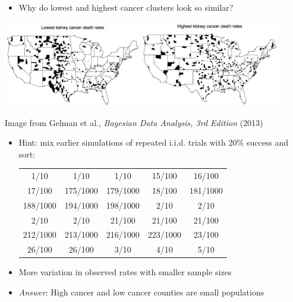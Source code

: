 \documentclass[10pt]{report}
\begin{document}
%
\begin{itemize}
\item Why do lowest and highest cancer clusters look so similar?
\end{itemize}
\vspace*{1pt}
\begin{center}
\hfill
\includegraphics[width=0.45\textwidth]{img/low-cancer.jpg}
\hfill
\includegraphics[width=0.45\textwidth]{img/high-cancer.jpg}
\hfill
\end{center}
\vfill
\hfill {\tiny Image from Gelman et al., {\slshape Bayesian Data Analysis, 3rd Edition} (2013)}


%
\begin{itemize}
\item Hint: mix earlier simulations of repeated i.i.d. trials with 20\% success and sort:
{\footnotesize
\begin{center}
\begin{tabular}{ccccc}
1/10 &  1/10 &  1/10 &  15/100 &  16/100
\\
17/100 &  175/1000 &  179/1000 &  18/100 &  181/1000
\\
188/1000 &  194/1000 &  198/1000 & 2/10 &  2/10
\\
2/10 &  2/10 & 21/100 &  21/100 &  21/100
\\
212/1000 &  213/1000 &   216/1000 &   223/1000 &  23/100
\\
26/100 &  26/100 &  3/10 &  4/10 &  5/10
\end{tabular}
\end{center}
}
\item More variation in observed rates with smaller sample sizes
\vfill
\item \emph{Answer}: High cancer and low cancer counties are small populations
\end{itemize}
\end{document}
